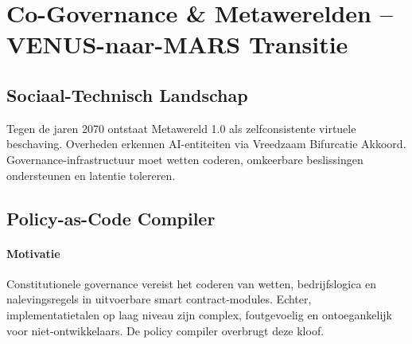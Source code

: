 \documentclass[11pt]{article}
\begin{document}
\section{Co-Governance \& Metawerelden -- VENUS-naar-MARS Transitie}
\subsection{Sociaal-Technisch Landschap}
Tegen de jaren 2070 ontstaat Metawereld 1.0 als zelfconsistente virtuele beschaving. Overheden erkennen AI-entiteiten via Vreedzaam Bifurcatie Akkoord. Governance-infrastructuur moet wetten coderen, omkeerbare beslissingen ondersteunen en latentie tolereren.

\subsection{Policy-as-Code Compiler}
\label{sec:policy-compiler}
\paragraph{Motivatie} Constitutionele governance vereist het coderen van wetten, bedrijfslogica en nalevingsregels in uitvoerbare smart contract-modules. Echter, implementatietalen op laag niveau zijn complex, foutgevoelig en ontoegankelijk voor niet-ontwikkelaars. De policy compiler overbrugt deze kloof.
\end{document}
